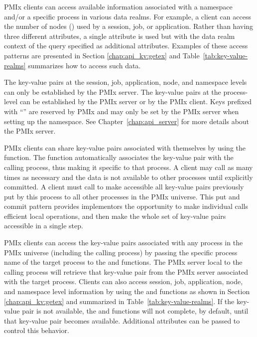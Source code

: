 \ac{PMIx} clients can access available information associated with a namespace and/or a specific process in various data realms.
For example, a client can access the number of nodes () used by a session, job, or application.
Rather than having three different attributes, a single attribute is used but with the data realm context of the query specified as additional attributes.
Examples of these access patterns are presented in Section \ref{chap:api_kv:getex} and Table~\ref{tab:key-value-realms} summarizes how to access such data.

The key-value pairs at the session, job, application, node, and namespace levels can only be established by the \ac{PMIx} server.
The key-value pairs at the process-level can be established by the \ac{PMIx} server or by the \ac{PMIx} client.
Keys prefixed with ``'' are reserved by \ac{PMIx} and may only be set by the \ac{PMIx} server when setting up the namespace.
See Chapter~\ref{chap:api_server} for more details about the \ac{PMIx} server.

\ac{PMIx} clients can share key-value pairs associated with themselves by using the  function.
The  function automatically associates the key-value pair with the calling process, thus making it specific to that process.
A client may call  as many times as necessary and the data is not available to other processes until explicitly committed.
A client must call  to make accessible all key-value pairs previously put by this process to all other processes in the \ac{PMIx} universe.
This put and commit pattern provides implementors the opportunity to make individual  calls efficient local operations, and then make the whole set of key-value pairs accessible in a single step.

\ac{PMIx} clients can access the key-value pairs associated with any process in the \ac{PMIx} universe (including the calling process) by passing the specific process name of the target process to the  and  functions.
The \ac{PMIx} server local to the calling process will retrieve that key-value pair from the \ac{PMIx} server associated with the target process.
Clients can also access session, job, application, node, and namespace level information by using the  and  functions as shown in Section \ref{chap:api_kv:getex} and summarized in Table~\ref{tab:key-value-realms}.
If the key-value pair is not available, the  and  functions will not complete, by default, until that key-value pair becomes available.
Additional attributes can be passed to control this behavior.

